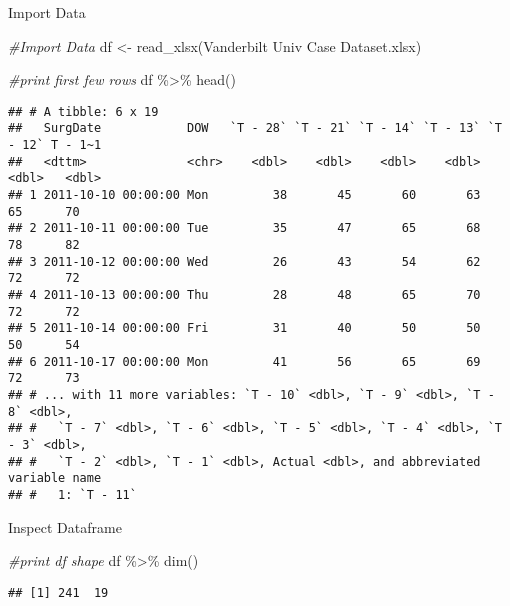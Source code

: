 \documentclass[
  ignorenonframetext,
]{beamer}
\newenvironment{Shaded}{\begin{snugshade}}{\end{snugshade}}
\newcommand{\CommentTok}[1]{\textcolor[rgb]{0.56,0.35,0.01}{\textit{#1}}}
\newcommand{\FunctionTok}[1]{\textcolor[rgb]{0.00,0.00,0.00}{#1}}
\newcommand{\NormalTok}[1]{#1}
\newcommand{\OtherTok}[1]{\textcolor[rgb]{0.56,0.35,0.01}{#1}}
\newcommand{\SpecialCharTok}[1]{\textcolor[rgb]{0.00,0.00,0.00}{#1}}
\newcommand{\StringTok}[1]{\textcolor[rgb]{0.31,0.60,0.02}{#1}}
\begin{document}
\begin{frame}[fragile]{Import Data}
\protect\hypertarget{import-data}{}
\begin{Shaded}
\begin{Highlighting}[]
\CommentTok{\#Import Data}
\NormalTok{df  }\OtherTok{\textless{}{-}} \FunctionTok{read\_xlsx}\NormalTok{(}\StringTok{\textquotesingle{}Vanderbilt Univ Case Dataset.xlsx\textquotesingle{}}\NormalTok{)}
\end{Highlighting}
\end{Shaded}

\begin{Shaded}
\begin{Highlighting}[]
\CommentTok{\#print first few rows}
\NormalTok{df }\SpecialCharTok{\%\textgreater{}\%}
  \FunctionTok{head}\NormalTok{()}
\end{Highlighting}
\end{Shaded}

\begin{verbatim}
## # A tibble: 6 x 19
##   SurgDate            DOW   `T - 28` `T - 21` `T - 14` `T - 13` `T - 12` T - 1~1
##   <dttm>              <chr>    <dbl>    <dbl>    <dbl>    <dbl>    <dbl>   <dbl>
## 1 2011-10-10 00:00:00 Mon         38       45       60       63       65      70
## 2 2011-10-11 00:00:00 Tue         35       47       65       68       78      82
## 3 2011-10-12 00:00:00 Wed         26       43       54       62       72      72
## 4 2011-10-13 00:00:00 Thu         28       48       65       70       72      72
## 5 2011-10-14 00:00:00 Fri         31       40       50       50       50      54
## 6 2011-10-17 00:00:00 Mon         41       56       65       69       72      73
## # ... with 11 more variables: `T - 10` <dbl>, `T - 9` <dbl>, `T - 8` <dbl>,
## #   `T - 7` <dbl>, `T - 6` <dbl>, `T - 5` <dbl>, `T - 4` <dbl>, `T - 3` <dbl>,
## #   `T - 2` <dbl>, `T - 1` <dbl>, Actual <dbl>, and abbreviated variable name
## #   1: `T - 11`
\end{verbatim}

\begin{block}{Inspect Dataframe}
\protect\hypertarget{inspect-dataframe}{}
\begin{Shaded}
\begin{Highlighting}[]
\CommentTok{\#print df shape}
\NormalTok{df }\SpecialCharTok{\%\textgreater{}\%} 
  \FunctionTok{dim}\NormalTok{()}
\end{Highlighting}
\end{Shaded}

\begin{verbatim}
## [1] 241  19
\end{verbatim}


\end{block}
\end{frame}
\end{document}
